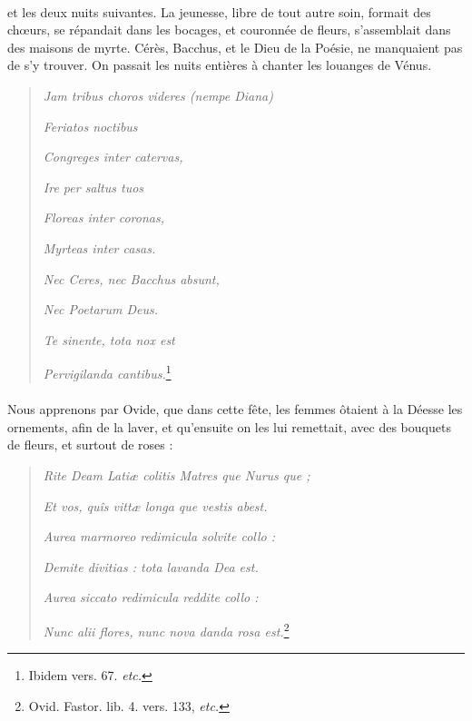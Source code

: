 \documentclass[a4paper, 18pt, oneside]{article}
\begin{document}
\paragraph{}
et les deux nuits suivantes. La jeunesse, libre de tout autre soin, formait des chœurs, se répandait dans les bocages, et couronnée de fleurs, s'assemblait dans des maisons de myrte. Cérès, Bacchus, et le Dieu de la Poésie, ne manquaient pas de s'y trouver. On passait les nuits entières à chanter les louanges de Vénus.
\begin{quotation}
\emph{Jam tribus choros videres (nempe Diana)}

\hspace*{5mm}\emph{Feriatos noctibus}

\emph{Congreges inter catervas,}

\hspace*{5mm}\emph{Ire per saltus tuos}

\emph{Floreas inter coronas,}

\hspace*{5mm}\emph{Myrteas inter casas.}

\emph{Nec Ceres, nec Bacchus absunt,}

\hspace*{5mm}\emph{Nec Poetarum Deus.}

\emph{Te sinente, tota nox est}

\hspace*{5mm}\emph{Pervigilanda cantibus.}\footnote{Ibidem vers. 67. \emph{etc.}}
\end{quotation}
\paragraph{}
Nous apprenons par Ovide, que dans cette fête, les femmes ôtaient à la Déesse les ornements, afin de la laver, et qu'ensuite on les lui remettait, avec des bouquets de fleurs, et surtout de roses :
\begin{quotation}
\emph{Rite Deam Latiæ colitis Matres que Nurus que ;}

\hspace*{5mm}\emph{Et vos, quîs vittæ longa que vestis abest.}

\emph{Aurea marmoreo redimicula solvite collo :}

\hspace*{5mm}\emph{Demite divitias : tota lavanda Dea est.}

\emph{Aurea siccato redimicula reddite collo :}

\hspace*{5mm}\emph{Nunc alii flores, nunc nova danda rosa est.}\footnote{Ovid. Fastor. lib. 4. vers. 133, \emph{etc.}}
\end{quotation}
\end{document}
